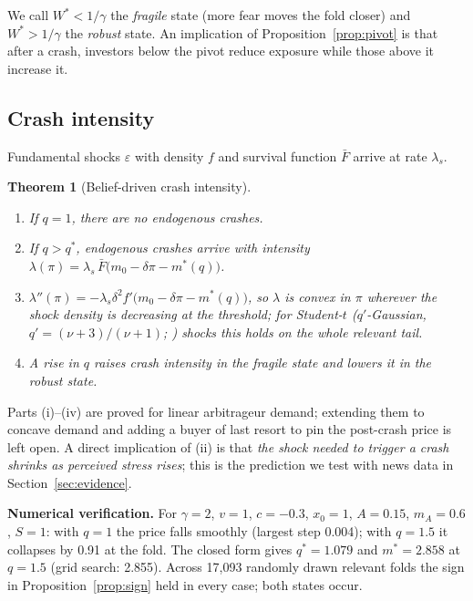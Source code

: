 \documentclass[11pt,a4paper]{article}
\newtheorem{theorem}{Theorem}
\theoremstyle{remark}
\begin{document}
\noindent We call $W^*<1/\gamma$ the \emph{fragile} state (more fear moves the fold closer)
and $W^*>1/\gamma$ the \emph{robust} state. An implication of Proposition~\ref{prop:pivot}
is that after a crash, investors below the pivot reduce exposure while those above it
increase it.

\subsection{Crash intensity}

Fundamental shocks $\varepsilon$ with density $f$ and survival function $\bar F$ arrive at
rate $\lambda_s$.

\begin{theorem}[Belief-driven crash intensity]\label{thm:curv}
\begin{enumerate}[label=(\roman*),leftmargin=*]
\item If $q=1$, there are no endogenous crashes.
\item If $q>q^*$, endogenous crashes arrive with intensity
$\lambda(\pi)=\lambda_s\,\bar F\big(m_0-\delta\pi-m^*(q)\big)$.
\item $\lambda''(\pi)=-\lambda_s\delta^2f'\big(m_0-\delta\pi-m^*(q)\big)$, so $\lambda$ is
convex in $\pi$ wherever the shock density is decreasing at the threshold; for Student-$t$
($q'$-Gaussian, $q'=(\nu+3)/(\nu+1)$; \citealp{deSouzaTsallis1997}) shocks this holds on
the whole relevant tail.
\item A rise in $q$ raises crash intensity in the fragile state and lowers it in the robust
state.
\end{enumerate}
\end{theorem}

\noindent Parts (i)--(iv) are proved for linear arbitrageur demand; extending them to concave
demand and adding a buyer of last resort to pin the post-crash price is left open. A direct
implication of (ii) is that \emph{the shock needed to trigger a crash shrinks as perceived
stress rises}; this is the prediction we test with news data in Section~\ref{sec:evidence}.

\noindent\textbf{Numerical verification.} For $\gamma=2$, $v=1$, $c=-0.3$, $x_0=1$,
$A=0.15$, $m_A=0.6$, $S=1$: with $q=1$ the price falls smoothly (largest step 0.004); with
$q=1.5$ it collapses by 0.91 at the fold. The closed form gives $q^*=1.079$ and $m^*=2.858$
at $q=1.5$ (grid search: 2.855). Across 17{,}093 randomly drawn relevant folds the sign in
Proposition~\ref{prop:sign} held in every case; both states occur.
\end{document}
